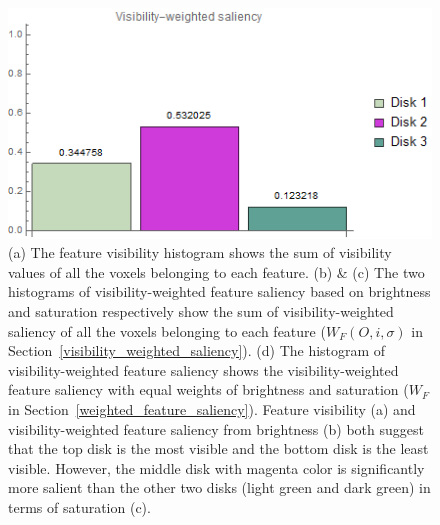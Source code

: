 \begin{figure}
\begin{minipage}{.45\textwidth}
		\subcaption{}
	\end{minipage}~
	\begin{minipage}{.45\textwidth}
		\includegraphics[width=1\linewidth]{images/disk_visibility_saliency_weighted_chart_left}
		\subcaption{}
	\end{minipage}
	\caption[(a) The feature visibility \cite{wang_efficient_2011} histogram shows the sum of visibility values of all the voxels belonging to each feature.]{(a) The feature visibility \cite{wang_efficient_2011} histogram shows the sum of visibility values of all the voxels belonging to each feature.
		(b) \& (c) The two histograms of visibility-weighted feature saliency based on brightness and saturation respectively show the sum of visibility-weighted saliency of all the voxels belonging to each feature ($ W_{F}(O,i,\sigma) $ in Section~\ref{visibility_weighted_saliency}).
		(d) The histogram of visibility-weighted feature saliency shows the visibility-weighted feature saliency with equal weights of brightness and saturation ($ W_{F} $ in Section~\ref{weighted_feature_saliency}).
		Feature visibility (a) and visibility-weighted feature saliency from brightness (b) both suggest that the top disk is the most visible and the bottom disk is the least visible.
		However, the middle disk with magenta color is significantly more salient than the other two disks (light green and dark green) in terms of saturation (c).
	}
	\label{fig:disks_saliency_chart_left}
\end{figure}

